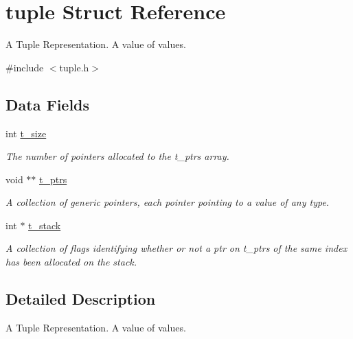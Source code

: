 \hypertarget{structtuple}{}\section{tuple Struct Reference}
\label{structtuple}


A Tuple Representation. A value of values.  




{\ttfamily \#include $<$tuple.\+h$>$}

\subsection*{Data Fields}
\begin{DoxyCompactItemize}
\item 
int \hyperlink{structtuple_a6b4b94c32d5387510174e59164ad07ef}{t\+\_\+size}\hypertarget{structtuple_a6b4b94c32d5387510174e59164ad07ef}{}\label{structtuple_a6b4b94c32d5387510174e59164ad07ef}

\begin{DoxyCompactList}\small\item\em The number of pointers allocated to the t\+\_\+ptrs array. \end{DoxyCompactList}\item 
void $\ast$$\ast$ \hyperlink{structtuple_a8df2b0dddda0145a22aca089a37ce802}{t\+\_\+ptrs}\hypertarget{structtuple_a8df2b0dddda0145a22aca089a37ce802}{}\label{structtuple_a8df2b0dddda0145a22aca089a37ce802}

\begin{DoxyCompactList}\small\item\em A collection of generic pointers, each pointer pointing to a value of any type. \end{DoxyCompactList}\item 
int $\ast$ \hyperlink{structtuple_ab4205b47ddc4a5a0c6aa4666ce4d9ea1}{t\+\_\+stack}\hypertarget{structtuple_ab4205b47ddc4a5a0c6aa4666ce4d9ea1}{}\label{structtuple_ab4205b47ddc4a5a0c6aa4666ce4d9ea1}

\begin{DoxyCompactList}\small\item\em A collection of flags identifying whether or not a ptr on t\+\_\+ptrs of the same index has been allocated on the stack. \end{DoxyCompactList}\end{DoxyCompactItemize}


\subsection{Detailed Description}
A Tuple Representation. A value of values. 

